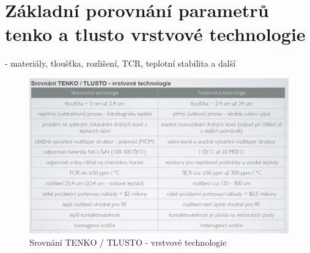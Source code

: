 \section{Základní porovnání parametrů tenko a tlusto vrstvové technologie}
- materiály, tloušťka, rozlišení, TCR, teplotní stabilita a další
\begin{figure}[h]
   \begin{center}
     \includegraphics[scale=0.5]{images/Srovnani.png}
   \end{center}
   \caption{Srovnání TENKO / TLUSTO - vrstvové technologie}
\end{figure}
